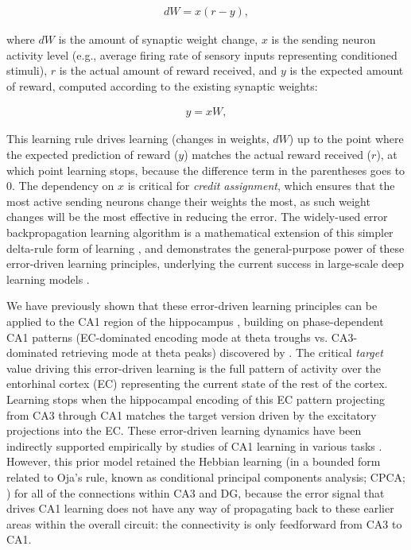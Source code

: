 \documentclass[10pt,letterpaper]{article}
\begin{document}
\begin{eqnarray}
\label{eq.Rescorla-Wagner}
	dW = x (r - y) ,
\end{eqnarray}

where $dW$ is the amount of synaptic weight change, $x$ is the sending neuron activity level (e.g., average firing rate of sensory inputs representing conditioned stimuli), $r$ is the actual amount of reward received, and $y$ is the expected amount of reward, computed according to the existing synaptic weights:

\begin{eqnarray}
\label{eq.prepostsynaptic}
	y = xW ,
\end{eqnarray}

This learning rule drives learning (changes in weights, $dW$) up to the point where the expected prediction of reward ($y$) matches the actual reward received ($r$), at which point learning stops, because the difference term in the parentheses goes to 0. The dependency on $x$ is critical for \emph{credit assignment}, which ensures that the most active sending neurons change their weights the most, as such weight changes will be the most effective in reducing the error.  The widely-used error backpropagation learning algorithm is a mathematical extension of this simpler delta-rule form of learning \cite{RumelhartHintonWilliams86}, and demonstrates the general-purpose power of these error-driven learning principles, underlying the current success in large-scale deep learning models \cite{LeCunBengioHinton15}.

We have previously shown that these error-driven learning principles can be applied to the CA1 region of the hippocampus \cite{KetzMorkondaOReilly13}, building on phase-dependent CA1 patterns (EC-dominated encoding mode at theta troughs vs. CA3-dominated retrieving mode at theta peaks) discovered by \cite{HasselmoBodelonWyble02}.  The critical \emph{target} value driving this error-driven learning is the full pattern of activity over the entorhinal cortex (EC) representing the current state of the rest of the cortex.  Learning stops when the hippocampal encoding of this EC pattern projecting from CA3 through CA1 matches the target version driven by the excitatory projections into the EC.  These error-driven learning dynamics have been indirectly supported empirically by studies of CA1 learning in various tasks \cite{SchapiroTurk-BrowneNormanEtAl16,SchapiroTurk-BrowneBotvinickEtAl17}.  However, this prior model retained the Hebbian learning (in a bounded form related to Oja's rule, known as conditional principal components analysis; CPCA; \cite{OReillyMunakata00}) for all of the connections within CA3 and DG, because the error signal that drives CA1 learning does not have any way of propagating back to these earlier areas within the overall circuit: the connectivity is only feedforward from CA3 to CA1.
\end{document}

